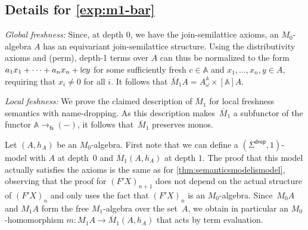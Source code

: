 \documentclass[11pt,a4paper]{amsart}
\newcommand{\drop}{\mathsf{drop}}
\newcommand{\fs}{\mathsf{fs}}
\newcommand{\Names}{\mathbb{A}}
\newcommand{\mbar}{\overline{M}_1}
\theoremstyle{plain}
\newcommand{\midmid}{\hspace{0.2ex}{\rule[-0.1ex]{0.6pt}{1.65ex}}\hspace{0.2ex}}
\newcommand{\newletter}[1]{{\midmid}#1}
\numberwithin{equation}{section}
\newcommand{\+}[1]{\mathcal{#1}\xspace}
\theoremstyle{definition}
\begin{document}
\subsection{Details for \cref{exp:m1-bar}}
\label{sec:m1-bar-details}


\noindent\emph{Global freshness:} Since, at depth 0, we have the
join-semilattice axioms, an \(M_0\)-algebra $A$ has an equivariant
join-semilattice structure.  Using the distributivity axioms and
(perm), depth-1 terms over $A$ can thus be normalized to the form
\(a_1x_1 + \dots + a_nx_n + \newletter{c}y\) for some sufficiently
fresh \(c \in \Names\) and \(x_1, \dots, x_n, y \in A\), requiring
that \(x_i \neq 0\) for all \(i\).  It follows that
\(\mbar A = A^{\Names}_\omega \times [\Names]A\).

\noindent\emph{Local feshness:} We prove the claimed description of \(\mbar\)
for local freshness semantics with name-dropping. As this description
makes~$\mbar$ a subfunctor of the functor $\Names \to_\fs (-)$, it
follows that~$\mbar$ preserves monos.


Let \((A, h_A)\) be an \(M_0\)-algebra.  First note that we can define
a \((\Sigma^\drop, 1)\)-model with \(A\) at depth~\(0\) and
\(\mbar(A, h_A)\) at depth \(1\).  The proof that this model actually
satisfies the axioms is the same as for
\cref{thm:semanticsmodelismodel}, observing that the proof for
\((F'X)_{n+1}\) does not depend on the actual structure of \((F'X)_n\)
and only uses the fact that \((F'X)_n\) is an \(M_0\)-algebra.
Since~$M_0A$ and $M_1A$ form the free $M_1$-algebra over the set~$A$,
we obtain in particular an $M_0$-homomorphism
\(m\colon M_1A \to \mbar(A,h_A)\) that acts by term evaluation.
\end{document}

